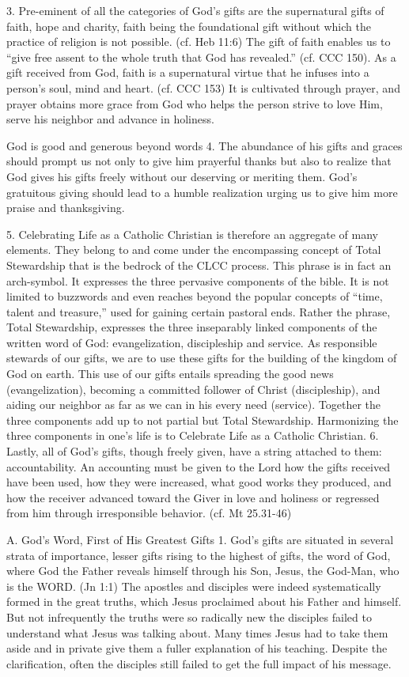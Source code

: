 \documentclass[oneside]{book}
\begin{document}
3. Pre-eminent of all the categories of God's gifts are the supernatural gifts
of faith, hope and charity, faith being the foundational gift without which the
practice of religion is not possible. (cf. Heb 11:6) The gift of faith enables
us to ``give free assent to the whole truth that God has revealed.'' (cf. CCC
150). As a gift received from God, faith is a supernatural virtue that he
infuses into a person's soul, mind and heart. (cf. CCC 153) It is cultivated
through prayer, and prayer obtains more grace from God who helps the person
strive to love Him, serve his neighbor and advance in holiness.

God is good and generous beyond words
4. The abundance of his gifts and graces should prompt us not only to give him
prayerful thanks but also to realize that God gives his gifts freely without our
deserving or meriting them. God's gratuitous giving should lead to a humble
realization urging us to give him more praise and thanksgiving.

5. Celebrating Life as a Catholic Christian is therefore an aggregate of many
elements. They belong to and come under the encompassing concept of Total
Stewardship that is the bedrock of the CLCC process. This phrase is in fact an
arch-symbol. It expresses the three pervasive components of the bible. It is not
limited to buzzwords and even reaches beyond the popular concepts of ``time,
talent and treasure,'' used for gaining certain pastoral ends.
Rather the phrase, Total Stewardship, expresses the three inseparably linked
components of the written word of God: evangelization, discipleship and
service. As responsible stewards of our gifts, we are to use these gifts for the
building of the kingdom of God on earth. This use of our gifts entails spreading
the good news (evangelization), becoming a committed follower of Christ
(discipleship), and aiding our neighbor as far as we can in his every need
(service). Together the three components add up to not partial but Total
Stewardship. Harmonizing the three components in one's life is to Celebrate Life
as a Catholic Christian.
6. Lastly, all of God's gifts, though freely given, have a string attached to
them: accountability. An accounting must be given to the Lord how the gifts
received have been used, how they were increased, what good works they produced,
and how the receiver advanced toward the Giver in love and holiness or regressed
from him through irresponsible behavior. (cf. Mt 25.31-46)

A. God's Word, First of His Greatest Gifts
1. God's gifts are situated in several strata of importance, lesser gifts rising
to the highest of gifts, the word of God, where God the Father reveals himself
through his Son, Jesus, the God-Man, who is the WORD. (Jn 1:1) The apostles and
disciples were indeed systematically formed in the great truths, which Jesus
proclaimed about his Father and himself.
But not infrequently the truths were so radically new the disciples failed to
understand what Jesus was talking about. Many times Jesus had to take them aside
and in private give them a fuller explanation of his teaching. Despite the
clarification, often the disciples still failed to get the full impact of his
message.
\end{document}
